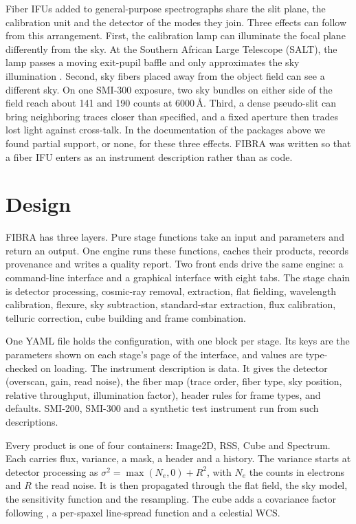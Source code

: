 \documentclass[11pt,twoside]{article}
\begin{document}
Fiber IFUs added to general-purpose spectrographs share the slit plane, the calibration unit and the detector of the modes they join. Three effects can follow from this arrangement. First, the calibration lamp can illuminate the focal plane differently from the sky. At the Southern African Large Telescope (SALT), the lamp passes a moving exit-pupil baffle and only approximates the sky illumination \citep{2008SPIE.7014E..6HB}. Second, sky fibers placed away from the object field can see a different sky. On one SMI-300 exposure, two sky bundles on either side of the field reach about 141 and 190 counts at 6000\,\AA. Third, a dense pseudo-slit can bring neighboring traces closer than specified, and a fixed aperture then trades lost light against cross-talk. In the documentation of the packages above we found partial support, or none, for these three effects. FIBRA was written so that a fiber IFU enters as an instrument description rather than as code.

\section{Design}

FIBRA has three layers. Pure stage functions take an input and parameters and return an output. One engine runs these functions, caches their products, records provenance and writes a quality report. Two front ends drive the same engine: a command-line interface and a graphical interface with eight tabs. The stage chain is detector processing, cosmic-ray removal, extraction, flat fielding, wavelength calibration, flexure, sky subtraction, standard-star extraction, flux calibration, telluric correction, cube building and frame combination.

One YAML file holds the configuration, with one block per stage. Its keys are the parameters shown on each stage's page of the interface, and values are type-checked on loading. The instrument description is data. It gives the detector (overscan, gain, read noise), the fiber map (trace order, fiber type, sky position, relative throughput, illumination factor), header rules for frame types, and defaults. SMI-200, SMI-300 and a synthetic test instrument run from such descriptions.

Every product is one of four containers: Image2D, RSS, Cube and Spectrum. Each carries flux, variance, a mask, a header and a history. The variance starts at detector processing as $\sigma^2 = \max(N_e, 0) + R^2$, with $N_e$ the counts in electrons and $R$ the read noise. It is then propagated through the flat field, the sky model, the sensitivity function and the resampling. The cube adds a covariance factor following \citet{2015MNRAS.446.1551S}, a per-spaxel line-spread function and a celestial WCS.
\end{document}
